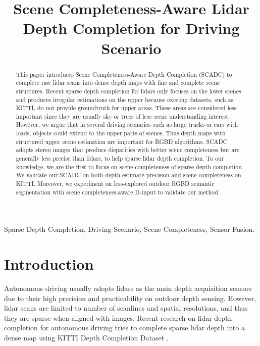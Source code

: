 \documentclass{article}
\title{Scene Completeness-Aware Lidar Depth Completion for Driving Scenario}
\begin{document}
\maketitle
\begin{abstract}
This paper introduces Scene Completeness-Aware Depth Completion (SCADC) to complete raw lidar scans into dense depth maps with fine and complete scene structures. Recent sparse depth completion for lidars only focuses on the lower scenes and produces irregular estimations on the upper because existing datasets, such as KITTI, do not provide groundtruth for upper areas. These areas are considered less important since they are usually sky or trees of less scene understanding interest. However, we argue that in several driving scenarios such as large trucks or cars with loads, objects could extend to the upper parts of scenes. Thus depth maps with structured upper scene estimation are important for RGBD algorithms. SCADC adopts stereo images that produce disparities with better scene completeness but are generally less precise than lidars, to help sparse lidar depth completion. To our knowledge, we are the first to focus on scene completeness of sparse depth completion. We validate our SCADC on both depth estimate precision and scene-completeness on KITTI. Moreover, we experiment on less-explored outdoor RGBD semantic segmentation with scene completeness-aware D-input to validate our method.

\end{abstract}

\begin{keywords}
Sparse Depth Completion, Driving Scenario, Scene Completeness, Sensor Fusion.
\end{keywords}
\section{Introduction}
\label{sec:intro}
Autonomous driving usually adopts lidars as the main depth acquisition sensors due to their high precision and practicability on outdoor depth sensing. However, lidar scans are limited to number of scanlines and spatial resolutions, and thus they are sparse when aligned with images. Recent research on lidar depth completion for autonomous driving tries to complete sparse lidar depth into a dense map \cite{uhrig2017sparsity, Ma2017SparseToDense,qiu2018deeplidar,ma2019self,zhong2019deep,leedepth,wang2018pnp,imran2019depth, chodosh18, chen2019learning, shivakumar2019dfusenet} using KITTI Depth Completion Dataset \cite{geiger2012we}. 
\end{document}
